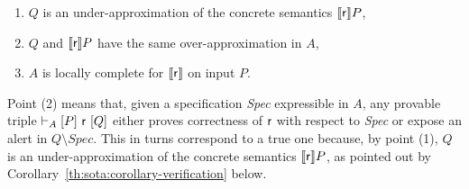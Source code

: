\begin{enumerate}
	\item $Q$ is an under-approximation of the concrete semantics $\llbracket\mathsf{r}\rrbracket P$,
	\item $Q$ and $\llbracket\mathsf{r}\rrbracket P$ have the same over-approximation in $A$,
	\item $A$ is locally complete for $\llbracket\mathsf{r}\rrbracket$ on input $P$.
\end{enumerate}

Point (2) means that, given a specification \textit{Spec} expressible in $A$, any provable triple $\vdash_{A}\nobreak[P]~\mathsf{r}~[Q]$ either proves correctness of $\mathsf{r}$ with respect to \textit{Spec} or expose an alert in $Q \setminus \textit{Spec}$. This in turns correspond to a true one because, by point (1), $Q$ is an under-approximation of the concrete semantics $\llbracket\mathsf{r}\rrbracket P$, as pointed out by Corollary~\ref{th:sota:corollary-verification} below.


